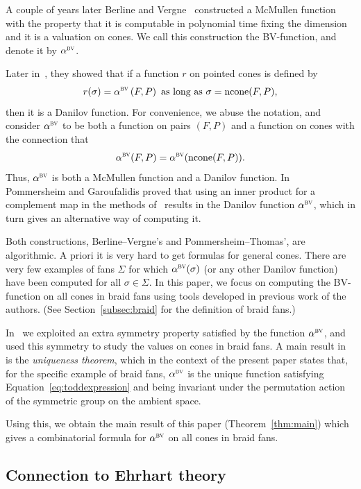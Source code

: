 \documentclass[ALCO,ThmDefs,Unicode,epreuves]{cedram}
\DeclareMathOperator{\ncone}{ncone}
\newcommand{\bv}{\alpha^{\textsc{bv}}}
\begin{document}
A couple of years later Berline and Vergne~\cite{bvoriginal} constructed a McMullen function with the property that it is computable in polynomial time fixing the dimension and it is a valuation on cones. We call this construction the BV-function, and denote it by $\bv$. 

Later in~\cite{bvtodd}, %
they showed that if a function $r$ on pointed cones is defined by
\[ r(\sigma) = \bv\left( F,P \right) \text{ as long as $\sigma = \ncone(F,P)$,}\]
then it is a Danilov function.
For convenience, we abuse the notation, and consider $\bv$ to be both a function on pairs $(F,P)$ and a function on cones with the connection that
\[ \bv(F,P) = \bv(\ncone(F,P)).\] 
Thus, $\bv$ is both a McMullen function and a Danilov function.
In~\cite{garpomm} Pommersheim and Garoufalidis proved that using an inner product for a complement map in the methods of~\cite{toddclass} results in the Danilov function $\bv$, which in turn gives an alternative way of computing it. 

Both constructions, Berline--Vergne's and Pommersheim--Thomas', are algorithmic. A priori it is very hard to get formulas for general cones. There are very few examples of fans $\Sigma$ for which $\bv(\sigma)$ (or any other Danilov function) have been computed for all $\sigma\in\Sigma$. In this paper, we focus on computing the BV-function on all cones in braid fans using tools developed in previous work of the authors. (See Section~\ref{subsec:braid} for the definition of braid fans.)


In~\cite{bvalpha} we exploited an extra symmetry property satisfied by the function $\bv$, and used this symmetry to study the values on cones in braid fans. A main result in~\cite{bvalpha} is the \emph{uniqueness theorem}, which in the context of the present paper states that, for the specific example of braid fans, $\bv$ is the unique function satisfying Equation~\eqref{eq:toddexpression} and being invariant under the permutation action of the symmetric group on the ambient space.

Using this, we obtain the main result of this paper (Theorem~\ref{thm:main}) which gives a combinatorial formula for $\bv$ on all cones in braid fans. 

\subsection{Connection to Ehrhart theory}
\end{document}
